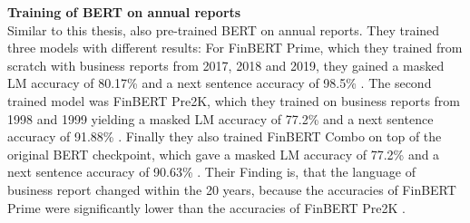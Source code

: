 \textbf{Training of \acs{BERT} on annual reports} \\
Similar to this thesis, \cite{DeSola2019} also pre-trained \acs{BERT} on annual reports.
They trained three models with different results:
For FinBERT Prime, which they trained from scratch with business reports from 2017, 2018 and 2019, they gained a masked LM accuracy of 80.17\% and a next sentence accuracy of 98.5\% \cite[pp. 6-7]{DeSola2019}.
The second trained model was FinBERT Pre2K, which they trained on business reports from 1998 and 1999 yielding a masked LM accuracy of 77.2\% and a next sentence accuracy of 91.88\% \cite[pp. 6-7]{DeSola2019}.
Finally they also trained FinBERT Combo on top of the original BERT checkpoint, which gave a masked LM accuracy of 77.2\% and a next sentence accuracy of 90.63\% \cite[pp. 6-7]{DeSola2019}.
Their Finding is, that the language of business report changed within the 20 years, because the accuracies of FinBERT Prime were significantly lower than the accuracies of FinBERT Pre2K \cite[pp. 7-8]{DeSola2019}.

